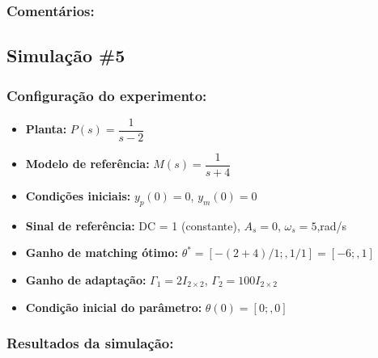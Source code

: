\documentclass[10pt]{article}
\begin{document}
\subsubsection{Comentários:}

\subsection{Simulação \#5}
\subsubsection{Configuração do experimento:}
\begin{itemize}
\item \textbf{Planta:} $P(s) = \dfrac{1}{s - 2}$
\item \textbf{Modelo de referência:} $M(s) = \dfrac{1}{s + 4}$
\item \textbf{Condições iniciais:} $y_p(0)=0$, $y_m(0)=0$
\item \textbf{Sinal de referência:} DC = 1 (constante), $A_s=0$, $\omega_s=5$,rad/s
\item \textbf{Ganho de matching ótimo:} $\theta^* = [-(2+4)/1;,1/1] = [-6;,1]$
\item \textbf{Ganho de adaptação:} $\Gamma_1 = 2I_{2\times2}$, $\Gamma_2 = 100 I_{2\times2}$
\item \textbf{Condição inicial do parâmetro:} $\theta(0) = [0;,0]$
\end{itemize}

\subsubsection{Resultados da simulação:}
\end{document}
